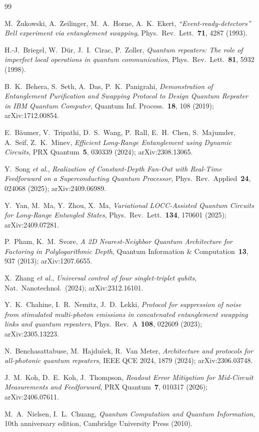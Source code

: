 \documentclass[11pt,a4paper]{article}
\theoremstyle{definition}
\begin{document}
\begin{thebibliography}{99}

M.~Żukowski, A.~Zeilinger, M.~A.~Horne, A.~K.~Ekert,
\textit{``Event-ready-detectors'' Bell experiment via entanglement swapping},
Phys.~Rev.~Lett.~\textbf{71}, 4287 (1993).

H.-J.~Briegel, W.~Dür, J.~I.~Cirac, P.~Zoller,
\textit{Quantum repeaters: The role of imperfect local operations in
  quantum communication}, Phys.~Rev.~Lett.~\textbf{81}, 5932 (1998).

B.~K.~Behera, S.~Seth, A.~Das, P.~K.~Panigrahi,
\textit{Demonstration of Entanglement Purification and Swapping Protocol
  to Design Quantum Repeater in IBM Quantum Computer},
Quantum Inf. Process.~\textbf{18}, 108 (2019); arXiv:1712.00854.

E.~Bäumer, V.~Tripathi, D.~S.~Wang, P.~Rall, E.~H.~Chen, S.~Majumder,
A.~Seif, Z.~K.~Minev,
\textit{Efficient Long-Range Entanglement using Dynamic Circuits},
PRX Quantum~\textbf{5}, 030339 (2024); arXiv:2308.13065.

Y.~Song \textit{et al.},
\textit{Realization of Constant-Depth Fan-Out with Real-Time Feedforward
  on a Superconducting Quantum Processor},
Phys.~Rev.~Applied~\textbf{24}, 024068 (2025); arXiv:2409.06989.

Y.~Yan, M.~Ma, Y.~Zhou, X.~Ma,
\textit{Variational LOCC-Assisted Quantum Circuits for Long-Range
  Entangled States}, Phys.~Rev.~Lett.~\textbf{134}, 170601 (2025);
arXiv:2409.07281.

P.~Pham, K.~M.~Svore,
\textit{A 2D Nearest-Neighbor Quantum Architecture for Factoring in
  Polylogarithmic Depth}, Quantum Information \& Computation~\textbf{13},
937 (2013); arXiv:1207.6655.

X.~Zhang \textit{et al.},
\textit{Universal control of four singlet-triplet qubits},
Nat.~Nanotechnol.~(2024); arXiv:2312.16101.

Y.~K.~Chahine, I.~R.~Nemitz, J.~D.~Lekki,
\textit{Protocol for suppression of noise from stimulated multi-photon
  emissions in concatenated entanglement swapping links and quantum
  repeaters}, Phys.~Rev.~A~\textbf{108}, 022609 (2023); arXiv:2305.13223.

N.~Benchasattabuse, M.~Hajdušek, R.~Van Meter,
\textit{Architecture and protocols for all-photonic quantum repeaters},
IEEE QCE 2024, 1879 (2024); arXiv:2306.03748.

J.~M.~Koh, D.~E.~Koh, J.~Thompson,
\textit{Readout Error Mitigation for Mid-Circuit Measurements and
  Feedforward}, PRX Quantum~\textbf{7}, 010317 (2026); arXiv:2406.07611.

M.~A.~Nielsen, I.~L.~Chuang, \textit{Quantum Computation and Quantum
  Information}, 10th anniversary edition, Cambridge University Press
(2010).

\end{thebibliography}
\end{document}
